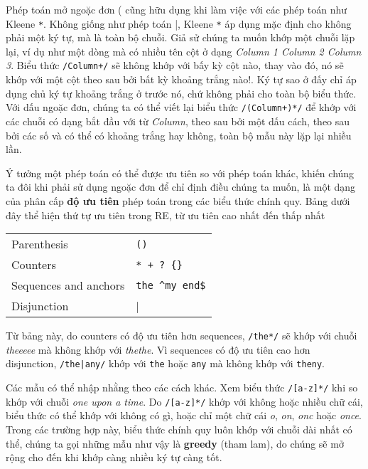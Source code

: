 Phép toán mở ngoặc đơn ( cũng hữu dụng khi làm việc với các phép toán như Kleene \verb|*|. Không giống như phép toán |, Kleene \verb|*| áp dụng mặc định cho không phải một ký tự, mà là toàn bộ chuỗi. Giả sử chúng ta muốn khớp một chuỗi lặp lại, ví dụ như một dòng mà có nhiều tên cột ở dạng \textit{Column 1 \hspace{0.1em} Column 2 \hspace{0.1em} Column 3}. Biểu thức \texttt{/Column\textvisiblespace[0-9]+\textvisiblespace*/} sẽ không khớp với bấy kỳ cột nào, thay vào đó, nó sẽ khớp với một cột theo sau bởi bất kỳ khoảng trắng nào!. Ký tự sao ở đấy chỉ áp dụng chủ ký tự khoảng trắng ở trước nó, chứ không phải cho toàn bộ biểu thức. Với dấu ngoặc đơn, chúng ta có thể viết lại biểu thức \texttt{/(Column\textvisiblespace[0-9]+\textvisiblespace*)*/} để khớp với các chuỗi có dạng bắt đầu với từ \textit{Column}, theo sau bởi một dấu cách, theo sau bởi các số và có thể có khoảng trắng hay không, toàn bộ mẫu này lặp lại nhiều lần.

Ý tưởng một phép toán có thể được ưu tiên so với phép toán khác, khiến chúng ta đôi khi phải sử dụng ngoặc đơn để chỉ định điều chúng ta muốn, là một dạng của phân cấp \textbf{độ ưu tiên} phép toán trong các biểu thức chính quy. Bảng dưới đây thể hiện thứ tự ưu tiên trong RE, từ ưu tiên cao nhất đến thấp nhất

\begin{center}
\begin{tabular}{ l l }
	 Parenthesis & \verb|()| \\
	 Counters  & \verb|* + ? {}| \\
	 Sequences and anchors & \verb|the ^my end$| \\
	 Disjunction & \verb||| \\
\end{tabular}
\end{center}

Từ bảng này, do counters có độ ưu tiên hơn sequences, \verb|/the*/| sẽ khớp với chuỗi \textit{theeeee} mà không khớp với \textit{thethe}. Vì sequences có độ ưu tiên cao hơn disjunction, \texttt{/the|any/} khớp với \verb|the| hoặc \verb|any| mà không khớp với \verb|theny|.

Các mẫu có thể nhập nhằng theo các cách khác. Xem biểu thức \verb|/[a-z]*/| khi so khớp với chuỗi \textit{one upon a time}. Do \verb|/[a-z]*/| khớp với không hoặc nhiều chữ cái, biểu thức có thể khớp với không có gì, hoặc chỉ một chữ cái \textit{o}, \textit{on}, \textit{onc} hoặc \textit{once}. Trong các trường hợp này, biểu thức chính quy luôn khớp với chuỗi dài nhất có thể, chúng ta gọi những mẫu như vậy là \textbf{greedy} (tham lam), do chúng sẽ mở rộng cho đến khi khớp càng nhiều ký tự càng tốt.

